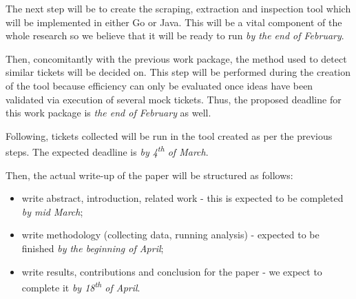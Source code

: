 \documentclass{mprop}
\begin{document}
The next step will be to create the scraping, extraction and inspection
tool which will be implemented in either Go or Java. This will be a vital
component of the whole research so we believe that it will be ready to run
\emph{by the end of February}.

Then, concomitantly with the previous work package, the method used to 
detect similar tickets will be decided on. This step will be performed
during the creation of the tool because efficiency can only be evaluated
once ideas have been validated via execution of several mock tickets. 
Thus, the proposed deadline for this work package is \emph{the end of February} as well.

Following, tickets collected will be run in the tool created as per the previous steps. 
The expected deadline is \emph{by 4\textsuperscript{th} of March}.

Then, the actual write-up of the paper will be structured as follows:
  \begin{itemize}
    \item write abstract, introduction, related work - this is expected
      to be completed \emph{by mid March};
    \item write methodology (collecting
      data, running analysis) - expected to be finished \emph{by the 
      beginning of April};
    \item write results, contributions and conclusion for the paper - 
      we expect to complete it \emph{by 18\textsuperscript{th} of April}.
  \end{itemize}


\end{document}
